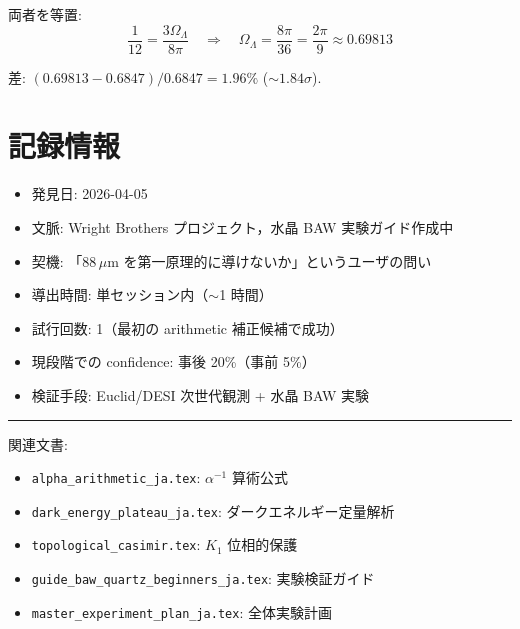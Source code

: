 \documentclass[11pt,a4paper]{article}
\begin{document}
両者を等置:
\begin{equation}
\frac{1}{12} = \frac{3\Omega_\Lambda}{8\pi}
\quad\Longrightarrow\quad
\Omega_\Lambda = \frac{8\pi}{36} = \frac{2\pi}{9} \approx 0.69813
\end{equation}

差: $(0.69813 - 0.6847)/0.6847 = 1.96\%$ ($\sim 1.84\sigma$).

\section{記録情報}

\begin{itemize}
\item 発見日: 2026-04-05
\item 文脈: Wright Brothers プロジェクト，水晶 BAW 実験ガイド作成中
\item 契機: 「88\,$\mu$m を第一原理的に導けないか」というユーザの問い
\item 導出時間: 単セッション内（$\sim$1 時間）
\item 試行回数: 1（最初の arithmetic 補正候補で成功）
\item 現段階での confidence: 事後 20\%（事前 5\%）
\item 検証手段: Euclid/DESI 次世代観測 + 水晶 BAW 実験
\end{itemize}

\vspace{2em}
\hrule
\vspace{0.5em}
\small
\noindent
関連文書:
\begin{itemize}
\item \texttt{alpha\_arithmetic\_ja.tex}: $\alpha^{-1}$ 算術公式
\item \texttt{dark\_energy\_plateau\_ja.tex}: ダークエネルギー定量解析
\item \texttt{topological\_casimir.tex}: $K_1$ 位相的保護
\item \texttt{guide\_baw\_quartz\_beginners\_ja.tex}: 実験検証ガイド
\item \texttt{master\_experiment\_plan\_ja.tex}: 全体実験計画
\end{itemize}
\end{document}
